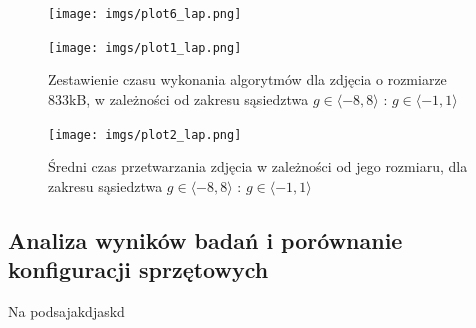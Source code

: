 \documentclass[document.tex]{subfiles}
\begin{document}
\begin{figure}[h]
\texttt{[image: imgs/plot6\_lap.png]}
\caption*{}
\label{fig:results_lap_hybrid}
\end{figure}

\begin{figure}[h]
\texttt{[image: imgs/plot1\_lap.png]}
\caption{Zestawienie czasu wykonania algorytmów dla zdjęcia o rozmiarze 833kB, 
        w zależności od zakresu sąsiedztwa $g\in \langle -8, 8 \rangle$ : $g\in \langle -1, 1 \rangle$ }
\label{fig:results_lap_hybrid}
\end{figure}

\begin{figure}[h]
\texttt{[image: imgs/plot2\_lap.png]}
\caption{Średni czas przetwarzania zdjęcia w zależności od jego rozmiaru, dla zakresu sąsiedztwa $g\in \langle -8, 8 \rangle$ : $g\in \langle -1, 1 \rangle$}
\label{fig:results_lap_hybrid}
\end{figure}
\clearpage

\subsection{Analiza wyników badań i porównanie konfiguracji sprzętowych}
\indent Na podsajakdjaskd
\end{document}
